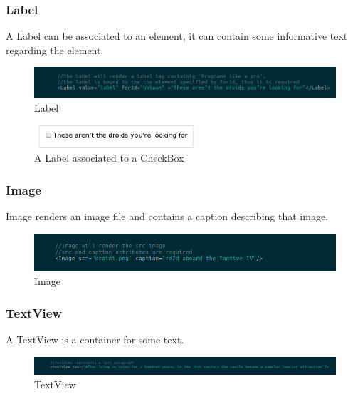 \subsubsection{Label}
A Label can be associated to an  element, it can contain some informative text regarding the element.
\begin{figure}[H]
	\centering
	\includegraphics[width=14cm]{../../documenti/UserManualFramework/framework_view/12framework_view_label.png}
	\caption{Label}
\end{figure}

\begin{figure}[H]
	\centering
	\includegraphics[width=6cm]{../../documenti/UserManualFramework/graphical_elements/labelGE.png}
	\caption{A Label associated to a CheckBox}
\end{figure}

\subsubsection{Image}
Image renders an image file and contains a caption describing that image.
\begin{figure}[H]
	\centering
	\includegraphics[width=14cm]{../../documenti/UserManualFramework/framework_view/13framework_view_image.png}
	\caption{Image}
\end{figure}

\subsubsection{TextView}
A TextView is a container for some text.
\begin{figure}[H]
	\centering
	\includegraphics[width=14cm]{../../documenti/UserManualFramework/framework_view/14framework_view_textview.png}
	\caption{TextView}
\end{figure}

